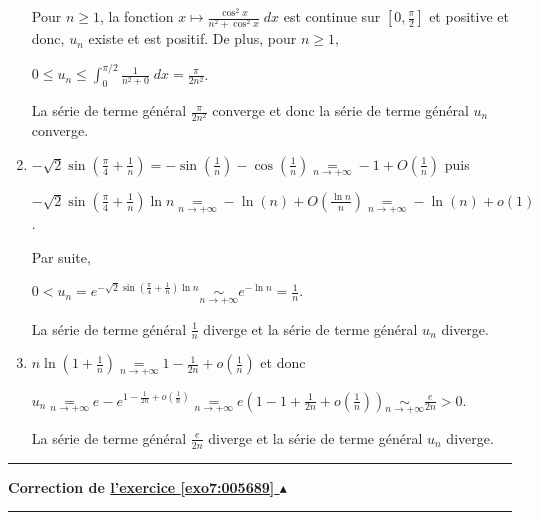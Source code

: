 \documentclass[11pt,a4paper]{article}
\newcounter{exo}
\newcommand{\correction}[1]{\hypertarget{cor7:#1}{}\label{cor7:#1}{\bf Correction de \hyperlink{exo7:#1}{l'exercice \ref{exo7:#1} $\blacktriangle$}}\vspace{1mm}\hrule\vspace{1mm}}
\newcommand{\fincorrection}{\vspace{1mm}\hrule\vspace*{7mm}}
\begin{document}
\begin{enumerate}
Pour $n\geqslant1$, la fonction $x\mapsto\frac{\cos^2x}{n^2+\cos^2x}\;dx$ est continue sur $\left[0,\frac{\pi}{2}\right]$ et positive et donc, $u_n$ existe et est positif. De plus, pour $n\geqslant1$,

\begin{center}
$0\leqslant u_n\leqslant\int_{0}^{\pi/2}\frac{1}{n^2+0}\;dx=\frac{\pi}{2n^2}$.
\end{center}

La série de terme général $\frac{\pi}{2n^2}$ converge et donc la série de terme général $u_n$ converge.

\item  $-\sqrt{2}\sin\left(\frac{\pi}{4}+\frac{1}{n}\right) =-\sin\left(\frac{1}{n}\right)-\cos\left(\frac{1}{n}\right)\underset{n\rightarrow+\infty}{=}-1+O\left(\frac{1}{n}\right)$ puis

\begin{center}
$-\sqrt{2}\sin\left(\frac{\pi}{4}+\frac{1}{n}\right)\ln n\underset{n\rightarrow+\infty}{=}-\ln(n)+O\left(\frac{\ln n}{n}\right)\underset{n\rightarrow+\infty}{=}-\ln(n)+o(1)$.
\end{center}

Par suite,

\begin{center}
$0< u_n=e^{-\sqrt{2}\sin\left(\frac{\pi}{4}+\frac{1}{n}\right)\ln n}\underset{n\rightarrow+\infty}{\sim}e^{-\ln n}=\frac{1}{n}$.
\end{center}

La série de terme général $\frac{1}{n}$ diverge et la série de terme général $u_n$ diverge.

\item  $n\ln\left(1+\frac{1}{n}\right)\underset{n\rightarrow+\infty}{=}1-\frac{1}{2n}+o\left(\frac{1}{n}\right)$ et donc

\begin{center}
$u_n\underset{n\rightarrow+\infty}{=}e-e^{1-\frac{1}{2n}+o\left(\frac{1}{n}\right)}\underset{n\rightarrow+\infty}{=}e\left(1-1+\frac{1}{2n}+o\left(\frac{1}{n}\right)\right)\underset{n\rightarrow+\infty}{\sim}\frac{e}{2n}>0$.
\end{center}

La série de terme général $\frac{e}{2n}$ diverge et la série de terme général $u_n$ diverge.
\end{enumerate}
\fincorrection
\correction{005689}
\end{document}
